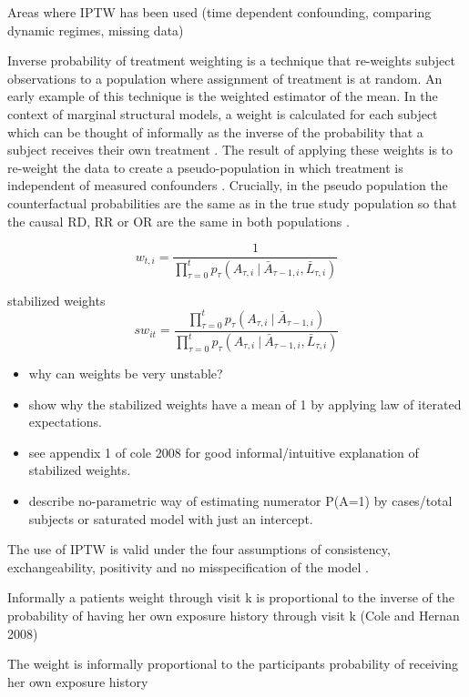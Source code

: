 \documentclass[11pt]{article}
\providecommand{\tightlist}{%
      \setlength{\itemsep}{0pt}\setlength{\parskip}{0pt}}
\begin{document}
\citet{Horvitz1952}

Areas where IPTW has been used (time dependent confounding, comparing
dynamic regimes, missing data)

Inverse probability of treatment weighting is a technique that
re-weights subject observations to a population where assignment of
treatment is at random. An early example of this technique is the
\citet{Horovitz1952} weighted estimator of the mean. In the context of
marginal structural models, a weight is calculated for each subject
which can be thought of informally as the inverse of the probability
that a subject receives their own treatment \citet{Robins2000}. The
result of applying these weights is to re-weight the data to create a
pseudo-population in which treatment is independent of measured
confounders \citet{Cole2008}. Crucially, in the pseudo population the
counterfactual probabilities are the same as in the true study
population so that the causal RD, RR or OR are the same in both
populations \citet{Robins2000}.

\[w_{t,i} = \frac{1}{\prod_{\tau=0} ^ t p_{\tau} (A_{\tau, i}\ |\ \bar A_{\tau-1, i}, \bar L_{\tau, i})}\]

stabilized weights
\[sw_{it} = \frac{\prod_{\tau=0} ^ t p_{\tau} (A_{\tau, i}\ |\ \bar A_{\tau-1, i})} {\prod_{\tau=0} ^ t p_{\tau} (A_{\tau, i}\ |\ \bar A_{\tau-1, i}, \bar L_{\tau, i})}\]

\begin{itemize}
\tightlist
\item
  why can weights be very unstable?
\item
  show why the stabilized weights have a mean of 1 by applying law of
  iterated expectations. \citet{Hernan2006}
\item
  see appendix 1 of cole 2008 for good informal/intuitive explanation of
  stabilized weights.
\item
  describe no-parametric way of estimating numerator P(A=1) by
  cases/total subjects or saturated model with just an intercept.
\end{itemize}

The use of IPTW is valid under the four assumptions of consistency,
exchangeability, positivity and no misspecification of the model
\citet{Cole2008}.

Informally a patients weight through visit k is proportional to the
inverse of the probability of having her own exposure history through
visit k (Cole and Hernan 2008)

The weight is informally proportional to the participants probability of
receiving her own exposure history
\end{document}
